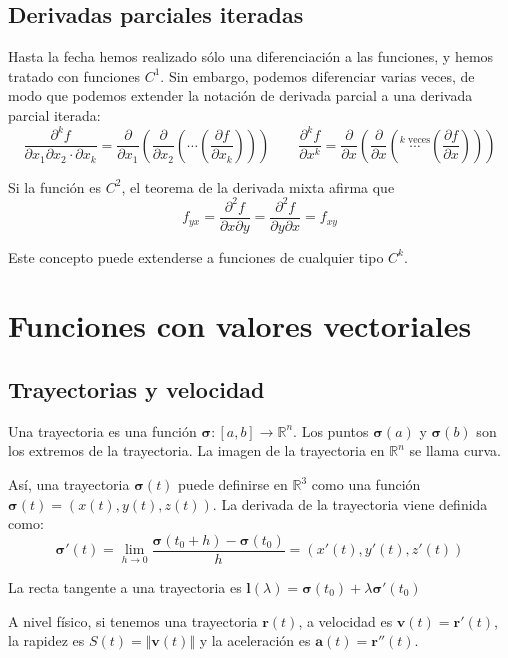 \documentclass[a4paper]{article}
\begin{document}
\subsection{Derivadas parciales iteradas}
Hasta la fecha hemos realizado sólo una diferenciación a las funciones, y hemos tratado con funciones $C^1$. Sin embargo, podemos diferenciar varias veces, de modo que podemos extender la notación de derivada parcial a una derivada parcial iterada:
\[ \frac{\partial^k f}{\partial x_1 \partial x_2 \cdot \partial x_k}  =
\frac{\partial}{\partial x_1} \left( \frac{\partial}{\partial x_2} \left( \cdots\left( \frac{\partial f}{\partial x_k}  \right)\right)\right) \qquad
\frac{\partial^k f}{\partial x^k}  =
\frac{\partial}{\partial x} \left( \frac{\partial}{\partial x} \left( \overset{k \text{ veces}}{\cdots}\left( \frac{\partial f}{\partial x}  \right)\right)\right)\] 

Si la función es $C^2$, el teorema de la derivada mixta afirma que 
\[ f_{yx} = \frac{\partial^2 f}{\partial x \partial y}  =  \frac{\partial^2 f}{\partial y \partial x} = f_{xy}\] 

Este concepto puede extenderse a funciones de cualquier tipo $C^k$.


\section{Funciones con valores vectoriales}
\subsection{Trayectorias y velocidad}
Una trayectoria es una función $\boldsymbol{\sigma}:[a,b] \rightarrow \mathbb{R}^n$. Los puntos $\boldsymbol{\sigma}(a)$ y $\boldsymbol{\sigma}(b)$ son los extremos de la trayectoria. La imagen de la trayectoria en $\mathbb{R}^n$ se llama curva. 

Así, una trayectoria $\boldsymbol{\sigma}(t)$ puede definirse en $\mathbb{R}^3$ como una función $\boldsymbol{\sigma}(t) = (x(t), y(t), z(t))$. La derivada de la trayectoria viene definida como:
\[ \boldsymbol{\sigma}'(t) = \lim_{h \rightarrow 0}\frac{\boldsymbol{\sigma}(t_0+h)-\boldsymbol{\sigma}(t_0)}{h} = (x'(t), y'(t), z'(t)) \]

La recta tangente a una trayectoria es $\textbf{l}(\lambda) = \boldsymbol{\sigma}(t_0) + \lambda\boldsymbol{\sigma}'(t_0)$

A nivel físico, si tenemos una trayectoria $\textbf{r}(t)$, a velocidad es $\textbf{v}(t)=\textbf{r}'(t)$, la rapidez es $S(t) = \Vert\textbf{v}(t)\Vert$ y la aceleración es $\textbf{a}(t) = \textbf{r}''(t)$.
\end{document}
